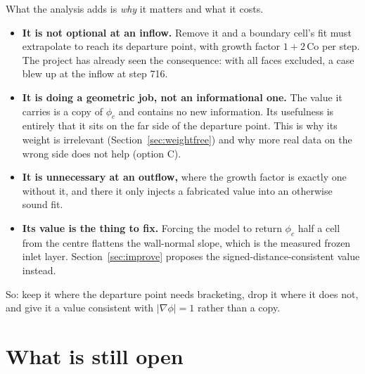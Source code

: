\documentclass[11pt,a4paper]{article}
\begin{document}
What the analysis adds is \emph{why} it matters and what it costs.

\begin{itemize}
\item \textbf{It is not optional at an inflow.} Remove it and a boundary cell's fit must
      extrapolate to reach its departure point, with growth factor $1 + 2\,\mathrm{Co}$ per
      step. The project has already seen the consequence: with all faces excluded, a case blew
      up at the inflow at step 716.
\item \textbf{It is doing a geometric job, not an informational one.} The value it carries is
      a copy of $\phi_c$ and contains no new information. Its usefulness is entirely that it
      sits on the far side of the departure point. This is why its weight is irrelevant
      (Section~\ref{sec:weightfree}) and why more real data on the wrong side does not help
      (option C).
\item \textbf{It is unnecessary at an outflow,} where the growth factor is exactly one without
      it, and there it only injects a fabricated value into an otherwise sound fit.
\item \textbf{Its value is the thing to fix.} Forcing the model to return $\phi_c$ half a cell
      from the centre flattens the wall-normal slope, which is the measured frozen inlet
      layer. Section~\ref{sec:improve} proposes the signed-distance-consistent value instead.
\end{itemize}

So: keep it where the departure point needs bracketing, drop it where it does not, and give
it a value consistent with $|\nabla \phi| = 1$ rather than a copy.

\section{What is still open}
\end{document}
